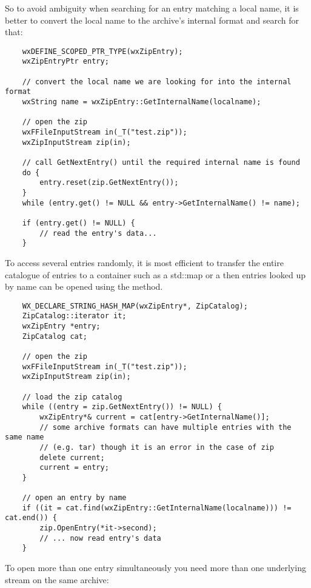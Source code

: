 So to avoid ambiguity when searching for an entry matching a local name,
it is better to convert the local name to the archive's internal format
and search for that:

\begin{verbatim}
    wxDEFINE_SCOPED_PTR_TYPE(wxZipEntry);
    wxZipEntryPtr entry;

    // convert the local name we are looking for into the internal format
    wxString name = wxZipEntry::GetInternalName(localname);

    // open the zip
    wxFFileInputStream in(_T("test.zip"));
    wxZipInputStream zip(in);

    // call GetNextEntry() until the required internal name is found
    do {
        entry.reset(zip.GetNextEntry());
    }
    while (entry.get() != NULL && entry->GetInternalName() != name);

    if (entry.get() != NULL) {
        // read the entry's data...
    }

\end{verbatim}

To access several entries randomly, it is most efficient to transfer the
entire catalogue of entries to a container such as a std::map or a
  then entries looked up by name can be
opened using the  method.

\begin{verbatim}
    WX_DECLARE_STRING_HASH_MAP(wxZipEntry*, ZipCatalog);
    ZipCatalog::iterator it;
    wxZipEntry *entry;
    ZipCatalog cat;

    // open the zip
    wxFFileInputStream in(_T("test.zip"));
    wxZipInputStream zip(in);

    // load the zip catalog
    while ((entry = zip.GetNextEntry()) != NULL) {
        wxZipEntry*& current = cat[entry->GetInternalName()];
        // some archive formats can have multiple entries with the same name
        // (e.g. tar) though it is an error in the case of zip
        delete current;
        current = entry;
    }

    // open an entry by name
    if ((it = cat.find(wxZipEntry::GetInternalName(localname))) != cat.end()) {
        zip.OpenEntry(*it->second);
        // ... now read entry's data
    }

\end{verbatim}

To open more than one entry simultaneously you need more than one
underlying stream on the same archive:

